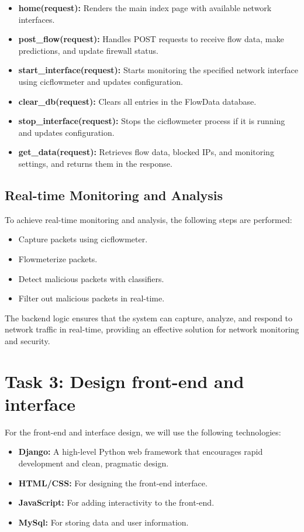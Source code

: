\begin{itemize}
    \item \textbf{home(request):} Renders the main index page with available network interfaces.
    \item \textbf{post\_flow(request):} Handles POST requests to receive flow data, make predictions, and update firewall status.
    \item \textbf{start\_interface(request):} Starts monitoring the specified network interface using cicflowmeter and updates configuration.
    \item \textbf{clear\_db(request):} Clears all entries in the FlowData database.
    \item \textbf{stop\_interface(request):} Stops the cicflowmeter process if it is running and updates configuration.
    \item \textbf{get\_data(request):} Retrieves flow data, blocked IPs, and monitoring settings, and returns them in the response.
\end{itemize}

\subsection{Real-time Monitoring and Analysis}
To achieve real-time monitoring and analysis, the following steps are performed:

\begin{itemize}
    \item Capture packets using cicflowmeter.
    \item Flowmeterize packets.
    \item Detect malicious packets with classifiers.
    \item Filter out malicious packets in real-time.
\end{itemize}

The backend logic ensures that the system can capture, analyze, and respond to network traffic in real-time, providing an effective solution for network monitoring and security.

\section{Task 3: Design front-end and interface}
For the front-end and interface design, we will use the following technologies:
\begin{itemize}
    \item \textbf{Django:} A high-level Python web framework that encourages rapid development and clean, pragmatic design.
    \item \textbf{HTML/CSS:} For designing the front-end interface.
    \item \textbf{JavaScript:} For adding interactivity to the front-end.
    \item \textbf{MySql:} For storing data and user information.
\end{itemize}

